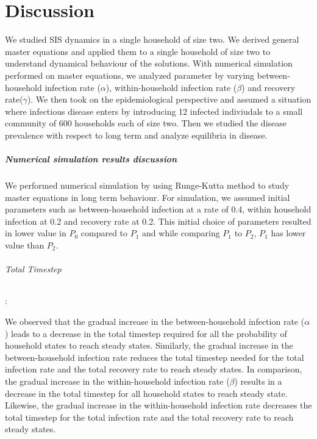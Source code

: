 \documentclass[paper=a4, fontsize=11pt, twoside, BCOR=12mm, parskip=full, listof=totoc]{scrreprt}
\begin{document}
{\chapter{Discussion}

We studied SIS dynamics in a single household of size two. We derived general master equations and applied them to a single household of size two to understand dynamical behaviour of the solutions. 
With numerical simulation performed on master equations, we analyzed parameter by varying between-household infection rate ($\alpha$), within-household infection rate ($\beta$) and recovery rate($\gamma$). We then took on the  epidemiological perspective and assumed a situation where infectious disease enters by introducing 12 infected indiviudals to a small community of 600 households each of size two. Then we studied the disease prevalence with respect to long term and analyze equilibria in disease.\\
\paragraph*{Numerical simulation results discussion}
We performed numerical simulation by using Runge-Kutta method to study master equations in long term behaviour. For simulation, we assumed initial parameters such as between-household infection at a rate of 0.4, within  household infection at 0.2 and recovery rate at 0.2. This initial choice of parameters resulted in lower value in $P_0$ compared to $P_1$ and while comparing $P_1$ to $P_2$, $P_1$ has lower value than $P_2$. 
\subparagraph*{Total Timestep} :

We observed that the gradual increase in the between-household infection rate (\(\alpha\)) leads to a decrease in the total timestep required for all the probability of household states to reach steady states. Similarly, the gradual increase in the between-household infection rate reduces the total timestep needed for the total infection rate and the total recovery rate to reach steady states. In comparison, the gradual increase in the within-household infection rate (\(\beta\)) results in a decrease in the total timestep for all household states to reach steady state. Likewise, the gradual increase in the within-household infection rate decreases the total timestep for the total infection rate and the total recovery rate to reach steady states.\\

}
\end{document}
